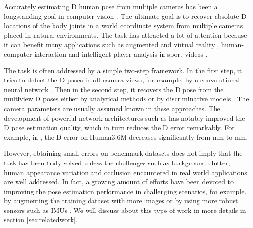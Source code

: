 Accurately estimating D human pose from multiple cameras has been a longstanding goal in computer vision \citep{liu2011markerless,bo2010twin,gall2010optimization,rhodin2018learning,amin2013multi,burenius20133D,PavlakosZDD17,belagiannis20143d}. The ultimate goal is to recover absolute D locations of the body joints in a world coordinate system from multiple cameras placed in natural environments. The task has attracted a lot of attention because it can benefit many applications such as augmented and virtual reality \citep{starner2003perceptive}, human-computer-interaction and intelligent player analysis in sport videos \citep{bridgeman2019multi}.


The task is often addressed by a simple two-step framework. In the first step, it tries to detect the D poses in all camera views, for example, by a convolutional neural network \citep{cao2017realtime,simplebaselines}. Then in the second step, it recovers the D pose from the multiview D poses either by analytical methods \citep{burenius20133D,PavlakosZDD17,belagiannis20143d,qiu2019cross,amin2013multi} or by discriminative models \citep{iskakov2019learnable, tu2020voxelpose}. The camera parameters are usually assumed known in these approaches. The development of powerful network architectures such as \citep{newell2016stacked} has notably improved the D pose estimation quality, which in turn reduces the D error remarkably. For example, in \citep{qiu2019cross}, the D error on Human3.6M \citep{ionescu2014human3} decreases significantly from mm to mm.


However, obtaining small errors on benchmark datasets does not imply that the task has been truly solved unless the challenges such as background clutter, human appearance variation and occlusion encountered in real world applications are well addressed. In fact, a growing amount of efforts \citep{zhou2017towards,cihai2019gcn,yang20183d,rogez2016mocap,pavlakos2018ordinal,cihai2020gcn} have been devoted to improving the pose estimation performance in challenging scenarios, for example, by augmenting the training dataset \citep{zhou2017towards,yang20183d,varol2017learning} with more images or by using more robust sensors such as IMUs \citep{trumble2017total}. We will discuss about this type of work in more details in section \ref{sec:relatedwork}.


